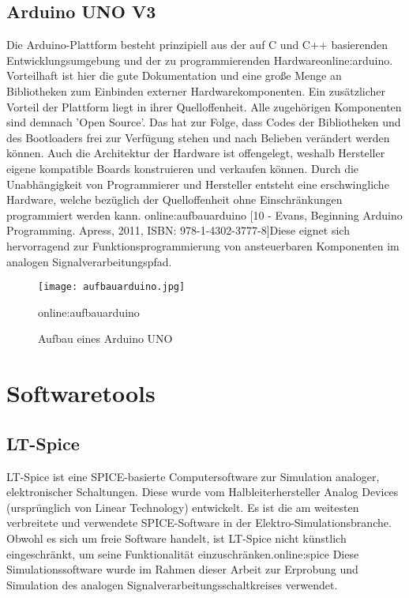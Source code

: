 \subsection{Arduino UNO V3}
\label{subsec:unov3}

Die Arduino-Plattform besteht prinzipiell aus der auf C und C++ basierenden Entwicklungsumgebung und der zu programmierenden Hardware\gls{online:arduino}. Vorteilhaft ist hier die gute Dokumentation und eine große Menge an Bibliotheken zum Einbinden externer Hardwarekomponenten. Ein zusätzlicher Vorteil der Plattform liegt in ihrer Quelloffenheit. Alle zugehörigen Komponenten sind demnach 'Open Source'. Das hat zur Folge, dass Codes der Bibliotheken und des Bootloaders frei zur Verfügung stehen und nach Belieben verändert werden können. Auch die Architektur der Hardware ist offengelegt, weshalb Hersteller eigene kompatible Boards konstruieren und verkaufen können. Durch die Unabhängigkeit von Programmierer und Hersteller entsteht eine erschwingliche Hardware, welche bezüglich der Quelloffenheit ohne Einschränkungen programmiert werden kann.\cite{arduino} \gls{online:aufbauarduino} [10 - Evans, Beginning Arduino Programming. Apress, 2011, ISBN: 978-1-4302-3777-8]Diese eignet sich hervorragend zur Funktionsprogrammierung von ansteuerbaren Komponenten im analogen Signalverarbeitungspfad.

\begin{figure}[H]
	\centering
	\texttt{[image: aufbauarduino.jpg]}
	\caption[Aufbau eines Arduino UNO]{Aufbau eines Arduino UNO} 
	\gls{online:aufbauarduino}
	\label{fig:aufbauarduino}
	\end{figure}

\section{Softwaretools}       
\subsection{LT-Spice}
\label{subsec:lts}
LT-Spice ist eine SPICE-basierte Computersoftware zur Simulation analoger, elektronischer Schaltungen. Diese wurde vom Halbleiterhersteller Analog Devices (ursprünglich von Linear Technology) entwickelt. Es ist die am weitesten verbreitete und verwendete SPICE-Software in der Elektro-Simulationsbranche. Obwohl es sich um freie Software handelt, ist LT-Spice nicht künstlich eingeschränkt, um seine Funktionalität einzuschränken.\gls{online:spice} Diese Simulationssoftware wurde im Rahmen dieser Arbeit zur Erprobung und Simulation des analogen Signalverarbeitungsschaltkreises verwendet.

